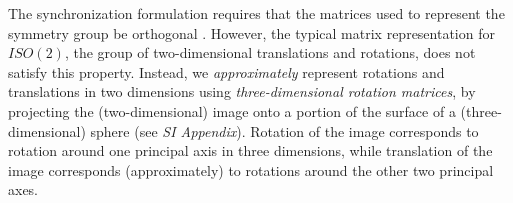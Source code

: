 \documentclass{pnastwo}
\begin{document}
\begin{article}
\begin{materials}
The synchronization formulation requires that the matrices used to represent the symmetry group be orthogonal \cite{singer2013spectral}.  
%
However, the typical matrix representation for $ISO(2)$, the group of two-dimensional translations and rotations, does not satisfy this property.
%
Instead, we {\em approximately} represent rotations and translations in two dimensions using {\em three-dimensional rotation matrices}, by projecting the (two-dimensional) image onto a portion of the surface of a (three-dimensional) sphere \cite{singer2011angular} (see {\it SI Appendix}).
%
Rotation of the image corresponds to rotation around one principal axis in three dimensions, while translation of the image corresponds (approximately) to rotations around the other two principal axes. %
%


\end{materials}
\end{article}
\end{document}
